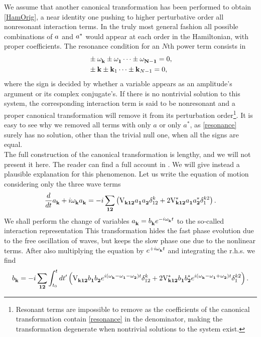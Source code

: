 We assume that another canonical transformation has been performed to obtain \eqref{HamOrig}, a near identity one
pushing to higher perturbative order all nonresonant interaction terms. In the truly most general fashion all possible combinations of $a^{}$ and $a^{*}$ 
would appear at each order in the Hamiltonian, with proper coefficients. The resonance condition for an $N$th power term consists in
\begin{align}
    &\pm \omega^{}_{\mathbf{k}} \pm \omega^{}_\mathbf{1} \dots \pm \omega^{}_\mathbf{N-1} = 0, \label{resonance}\\
    &\pm \mathbf{k} \pm \mathbf{k}_1 \dots \pm \mathbf{k}_{N-1} = 0,
\end{align}
where the sign is decided by whether a variable appears as an amplitude's argument or its complex conjugate's. If there is no nontrivial solution to this system, the corresponding 
interaction term is said to be nonresonant and a proper canonical transformation will remove it from its perturbation order\footnote{
    Resonant terms are impossible to remove as the coefficients of the canonical transformation contain \eqref{resonance} in the denominator,
making the transformation degenerate when nontrivial solutions to the system exist.
}. It is easy to see why we removed all terms
with only $a$ or only $a^*$, as \eqref{resonance} surely has no solution, other than the trivial null one, when all the signs are equal.\\
The full construction of the canonical transformation is lengthy, and we will not present it here. The reader can find a full account in \cite{Zakharov}.
We will give instead a plausible explanation for this phenomenon. Let us write the equation of motion considering only the three wave terms
\begin{equation}
    \frac{d}{dt} a_\mathbf{k}^{} + i \omega^{}_{\mathbf{k}} a_\mathbf{k}^{} = -i\sum_{\mathbf{12}} \left( \mathrm{V}_{\mathbf{k12}}^{} a_\mathbf{1}^{} a_\mathbf{2}^{} \delta^{k}_{12} + 2 
    \mathrm{V}^*_\mathbf{k12}a_\mathbf{1}^{} a_\mathbf{2}^{*} \delta^{k2}_{1}  \right).
\end{equation}
We shall perform the change of variables $a_\mathbf{k}^{} = b_\mathbf{k}^{} e^{-i\omega^{}_{\mathbf{k}} t}$ to the so-called interaction representation
This transformation hides the fast phase evolution due to the free oscillation of waves, but keeps the slow phase 
one due to the nonlinear terms. After also multiplying the equation by $e^{+i\omega^{}_{\mathbf{k}} t}$ and integrating the r.h.s. we find
\begin{equation}
    b_\mathbf{k}^{}= -i\sum_{\mathbf{12}} \int_{t_0}^{t} dt'\left( \mathrm{V}_{\mathbf{k12}}^{} b_\mathbf{1}^{} b_\mathbf{2}^{}e^{i( \omega^{}_{\mathbf{k}}-\omega^{}_\mathbf{1} - \omega^{}_\mathbf{2})t} \delta^{k}_{12} 
    + 2 \mathrm{V}^*_\mathbf{k12}b_\mathbf{1}^{} b_\mathbf{2}^{*}e^{i(\omega^{}_{\mathbf{k}}-\omega^{}_\mathbf{1} + \omega^{}_\mathbf{2})t} \delta^{k2}_{1}  \right).
\end{equation}
